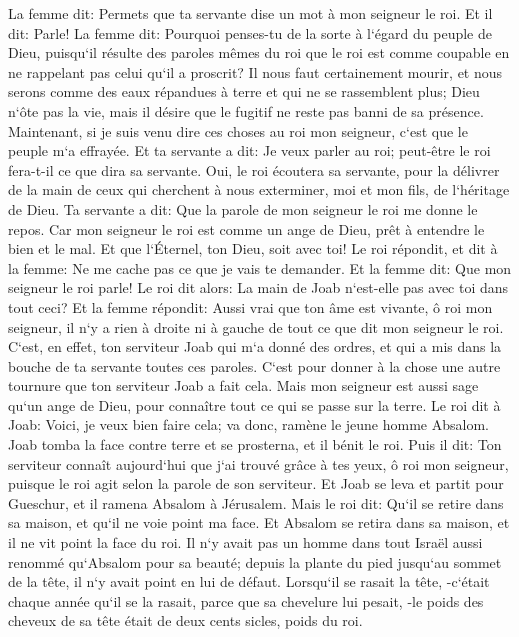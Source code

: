 \verse La femme dit: Permets que ta servante dise un mot à mon seigneur le roi. Et il dit: Parle! 
\verse La femme dit: Pourquoi penses-tu de la sorte à l`égard du peuple de Dieu, puisqu`il résulte des paroles mêmes du roi que le roi est comme coupable en ne rappelant pas celui qu`il a proscrit? 
\verse Il nous faut certainement mourir, et nous serons comme des eaux répandues à terre et qui ne se rassemblent plus; Dieu n`ôte pas la vie, mais il désire que le fugitif ne reste pas banni de sa présence. 
\verse Maintenant, si je suis venu dire ces choses au roi mon seigneur, c`est que le peuple m`a effrayée. Et ta servante a dit: Je veux parler au roi; peut-être le roi fera-t-il ce que dira sa servante. 
\verse Oui, le roi écoutera sa servante, pour la délivrer de la main de ceux qui cherchent à nous exterminer, moi et mon fils, de l`héritage de Dieu. 
\verse Ta servante a dit: Que la parole de mon seigneur le roi me donne le repos. Car mon seigneur le roi est comme un ange de Dieu, prêt à entendre le bien et le mal. Et que l`Éternel, ton Dieu, soit avec toi! 
\verse Le roi répondit, et dit à la femme: Ne me cache pas ce que je vais te demander. Et la femme dit: Que mon seigneur le roi parle! 
\verse Le roi dit alors: La main de Joab n`est-elle pas avec toi dans tout ceci? Et la femme répondit: Aussi vrai que ton âme est vivante, ô roi mon seigneur, il n`y a rien à droite ni à gauche de tout ce que dit mon seigneur le roi. C`est, en effet, ton serviteur Joab qui m`a donné des ordres, et qui a mis dans la bouche de ta servante toutes ces paroles. 
\verse C`est pour donner à la chose une autre tournure que ton serviteur Joab a fait cela. Mais mon seigneur est aussi sage qu`un ange de Dieu, pour connaître tout ce qui se passe sur la terre. 
\verse Le roi dit à Joab: Voici, je veux bien faire cela; va donc, ramène le jeune homme Absalom. 
\verse Joab tomba la face contre terre et se prosterna, et il bénit le roi. Puis il dit: Ton serviteur connaît aujourd`hui que j`ai trouvé grâce à tes yeux, ô roi mon seigneur, puisque le roi agit selon la parole de son serviteur. 
\verse Et Joab se leva et partit pour Gueschur, et il ramena Absalom à Jérusalem. 
\verse Mais le roi dit: Qu`il se retire dans sa maison, et qu`il ne voie point ma face. Et Absalom se retira dans sa maison, et il ne vit point la face du roi. 
\verse Il n`y avait pas un homme dans tout Israël aussi renommé qu`Absalom pour sa beauté; depuis la plante du pied jusqu`au sommet de la tête, il n`y avait point en lui de défaut. 
\verse Lorsqu`il se rasait la tête, -c`était chaque année qu`il se la rasait, parce que sa chevelure lui pesait, -le poids des cheveux de sa tête était de deux cents sicles, poids du roi. 
